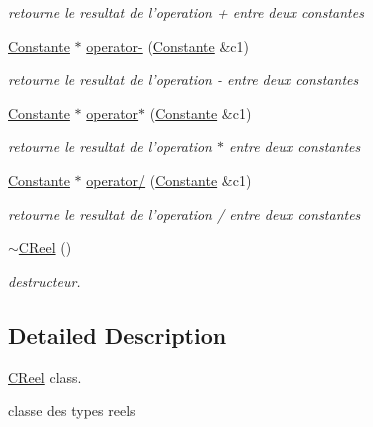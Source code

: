 \begin{DoxyCompactItemize}
\begin{DoxyCompactList}\small\item\em retourne le resultat de l'operation + entre deux constantes \end{DoxyCompactList}\item 
\hyperlink{class_constante}{Constante} $\ast$ \hyperlink{class_c_reel_abb39aa0b30a2673bdc34b808da836006}{operator-\/} (\hyperlink{class_constante}{Constante} \&c1)
\begin{DoxyCompactList}\small\item\em retourne le resultat de l'operation -\/ entre deux constantes \end{DoxyCompactList}\item 
\hyperlink{class_constante}{Constante} $\ast$ \hyperlink{class_c_reel_ac0730d78556c60bf9824fff423554033}{operator$\ast$} (\hyperlink{class_constante}{Constante} \&c1)
\begin{DoxyCompactList}\small\item\em retourne le resultat de l'operation $\ast$ entre deux constantes \end{DoxyCompactList}\item 
\hyperlink{class_constante}{Constante} $\ast$ \hyperlink{class_c_reel_a12bf069085a82f9d6b99482f538258f9}{operator/} (\hyperlink{class_constante}{Constante} \&c1)
\begin{DoxyCompactList}\small\item\em retourne le resultat de l'operation / entre deux constantes \end{DoxyCompactList}\item 
\hypertarget{class_c_reel_a47f3787b86e124ecf1eb443678afacec}{\hyperlink{class_c_reel_a47f3787b86e124ecf1eb443678afacec}{$\sim$\-C\-Reel} ()}\label{class_c_reel_a47f3787b86e124ecf1eb443678afacec}

\begin{DoxyCompactList}\small\item\em destructeur. \end{DoxyCompactList}\end{DoxyCompactItemize}


\subsection{Detailed Description}
\hyperlink{class_c_reel}{C\-Reel} class. 

classe des types reels 


